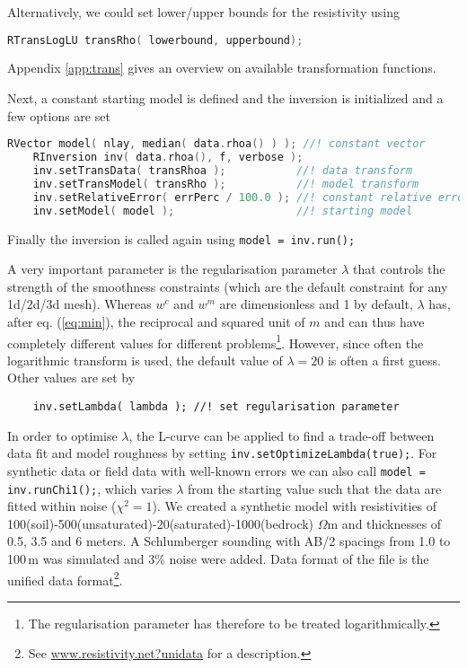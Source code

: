 Alternatively, we could set lower/upper bounds for the resistivity using
\begin{lstlisting}[language=C++]
    RTransLogLU transRho( lowerbound, upperbound);
\end{lstlisting}
Appendix \ref{app:trans} gives an overview on available transformation functions.

Next, a constant starting model is defined and the inversion is initialized and a few options are set
\begin{lstlisting}[language=C++]
    RVector model( nlay, median( data.rhoa() ) ); //! constant vector
    RInversion inv( data.rhoa(), f, verbose );
    inv.setTransData( transRhoa );           //! data transform
    inv.setTransModel( transRho );           //! model transform
    inv.setRelativeError( errPerc / 100.0 ); //! constant relative error
    inv.setModel( model );                   //! starting model
\end{lstlisting}

Finally the inversion is called again using \lstinline|model = inv.run();|

A very important parameter is the regularisation parameter $\lambda$ that controls the strength of the smoothness constraints (which are the default constraint for any 1d/2d/3d mesh).
Whereas $w^c$ and $w^m$ are dimensionless and 1 by default, $\lambda$ has, after eq. (\ref{eq:min}), the reciprocal and squared unit of $m$ and can thus have completely different values for different problems\footnote{The regularisation parameter has therefore to be treated logarithmically.}.
However, since often the logarithmic transform is used, the default value of $\lambda=20$ is often a first guess.
Other values are set by
\begin{lstlisting}
    inv.setLambda( lambda ); //! set regularisation parameter
\end{lstlisting}

In order to optimise $\lambda$, the L-curve \citep{guentherruecker06,guentherdiss} can be applied to find a trade-off between data fit and model roughness by setting \lstinline|inv.setOptimizeLambda(true);|.
For synthetic data or field data with well-known errors we can also call \lstinline|model = inv.runChi1();|, which varies $\lambda$ from the starting value such that the data are fitted within noise ($\chi^2=1$).
We created a synthetic model with resistivities of 100(soil)-500(unsaturated)-20(saturated)-1000(bedrock) $\Omega$m and thicknesses of 0.5, 3.5 and 6 meters.
A Schlumberger sounding with AB/2 spacings from 1.0 to 100\,m was simulated and 3\% noise were added.
Data format of the file  is the unified data format\footnote{See \url{www.resistivity.net?unidata} for a description.}.

